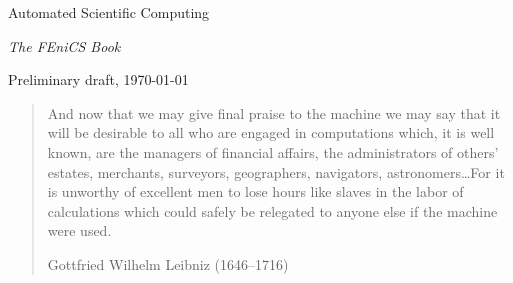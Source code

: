\begin{center}

  \vspace{1cm}

  \LARGE

  Automated Scientific Computing

  \vspace{1cm}

  \emph{The FEniCS Book}

  \vfill

  \Large

  Preliminary draft, \today

\end{center}
\cleardoublepage

\null\vspace{5cm}
\linespread{1.5}
\begin{center}
  \begin{quote}
    \it

    And now that we may give final praise to the machine we may say that
    it will be desirable to all who are engaged in computations which, it
    is well known, are the managers of financial affairs, the
    administrators of others' estates, merchants, surveyors, geographers,
    navigators, astronomers\ldots For it is unworthy of excellent men to lose
    hours like slaves in the labor of calculations which could safely be
    relegated to anyone else if the machine were used.
    
    \rm

    \vspace{0.5cm}
    
    Gottfried Wilhelm Leibniz (1646--1716)
  \end{quote}
\end{center}
\linespread{1.0}
\cleardoublepage

\pagestyle{fancy}
